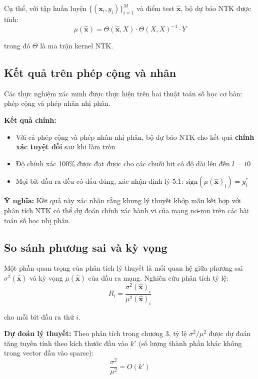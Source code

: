 Cụ thể, với tập huấn luyện $\{(\mathbf{x}_i, y_i)\}_{i=1}^{M}$ và điểm test $\hat{\mathbf{x}}$, bộ dự báo NTK được tính:
\begin{equation}
    \mu(\hat{\mathbf{x}}) = \Theta(\hat{\mathbf{x}}, X) \cdot \Theta(X, X)^{-1} \cdot Y
\end{equation}

trong đó $\Theta$ là ma trận kernel NTK.

\subsection{Kết quả trên phép cộng và nhân}

Các thực nghiệm xác minh được thực hiện trên hai thuật toán số học cơ bản: phép cộng và phép nhân nhị phân.

\vspace{0.2cm}

\textbf{Kết quả chính:}
\begin{itemize}
    \item Với cả phép cộng và phép nhân nhị phân, bộ dự báo NTK cho kết quả \textbf{chính xác tuyệt đối} sau khi làm tròn
    \item Độ chính xác 100\% được đạt được cho các chuỗi bit có độ dài lên đến $l = 10$
    \item Mọi bit đầu ra đều có dấu đúng, xác nhận định lý 5.1: $\text{sign}(\mu(\hat{\mathbf{x}})_i) = y_i^*$
\end{itemize}

\textbf{Ý nghĩa:} Kết quả này xác nhận rằng khung lý thuyết khớp mẫu kết hợp với phân tích NTK có thể dự đoán chính xác hành vi của mạng nơ-ron trên các bài toán số học nhị phân.

\subsection{So sánh phương sai và kỳ vọng}

Một phần quan trọng của phân tích lý thuyết là mối quan hệ giữa phương sai $\sigma^2(\hat{\mathbf{x}})$ và kỳ vọng $\mu(\hat{\mathbf{x}})$ của đầu ra mạng. Nghiên cứu phân tích tỷ lệ:
\begin{equation}
    R_i = \frac{\sigma^2(\hat{\mathbf{x}})_i}{\mu^2(\hat{\mathbf{x}})_i}
\end{equation}

cho mỗi bit đầu ra thứ $i$.

\vspace{0.2cm}

\textbf{Dự đoán lý thuyết:}
Theo phân tích trong chương 3, tỷ lệ $\sigma^2/\mu^2$ được dự đoán tăng tuyến tính theo kích thước đầu vào $k'$ (số lượng thành phần khác không trong vector đầu vào sparse):
\begin{equation}
    \frac{\sigma^2}{\mu^2} = O(k')
\end{equation}

